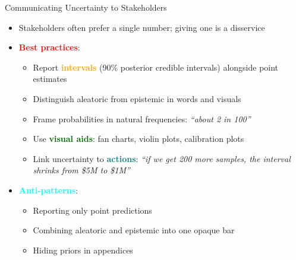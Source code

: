 \documentclass[
  10pt,
  ignorenonframetext,
]{beamer}
\providecommand{\tightlist}{%
  \setlength{\itemsep}{0pt}\setlength{\parskip}{0pt}}
\begin{document}
\begin{frame}{Communicating Uncertainty to Stakeholders}
\label{communicating-uncertainty-to-stakeholders}
\begin{itemize}
\item
  Stakeholders often prefer a single number; giving one is a disservice
\item
  \textbf{\textcolor{red}{Best practices}}:

  \begin{itemize}
  \tightlist
  \item
    Report \textbf{\textcolor{orange}{intervals}} (90\% posterior
    credible intervals) alongside point estimates
  \item
    Distinguish aleatoric from epistemic in words and visuals
  \item
    Frame probabilities in natural frequencies: \emph{``about 2 in
    100''}
  \item
    Use \textbf{\textcolor{darkgreen}{visual aids}}: fan charts, violin
    plots, calibration plots
  \item
    Link uncertainty to \textbf{\textcolor{teal}{actions}}: \emph{``if
    we get 200 more samples, the interval shrinks from \$5M to \$1M''}
  \end{itemize}
\item
  \textbf{\textcolor{cyan}{Anti-patterns}}:

  \begin{itemize}
  \tightlist
  \item
    Reporting only point predictions
  \item
    Combining aleatoric and epistemic into one opaque bar
  \item
    Hiding priors in appendices
  \end{itemize}
\end{itemize}
\end{frame}
\end{document}
